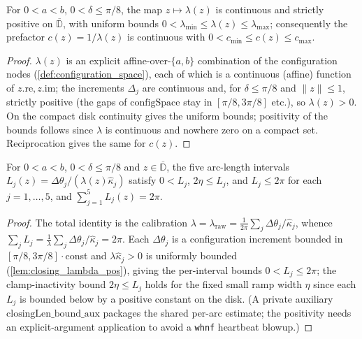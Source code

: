 \begin{lemma}
  \label{lem:closing_lambda_pos}
  For $0<a<b$, $0<\delta\le\pi/8$, the map $z\mapsto\lambda(z)$ is continuous and
  strictly positive on $\overline{\mathbb{D}}$, with uniform bounds
  $0<\lambda_{\min}\le\lambda(z)\le\lambda_{\max}$; consequently the prefactor
  $c(z)=1/\lambda(z)$ is continuous with $0<c_{\min}\le c(z)\le c_{\max}$.
\end{lemma}
\begin{proof}
  $\lambda(z)$ is an explicit affine-over-$\{a,b\}$ combination of the configuration
  nodes (\cref{def:configuration_space}), each of which is a continuous (affine)
  function of $z.\mathrm{re},z.\mathrm{im}$; the increments $\Delta_j$ are continuous
  and, for $\delta\le\pi/8$ and $\|z\|\le1$, strictly positive (the gaps of
  $\mathrm{configSpace}$ stay in $[\pi/8,3\pi/8]$ etc.), so $\lambda(z)>0$. On the
  compact disk continuity gives the uniform bounds; positivity of the bounds follows
  since $\lambda$ is continuous and nowhere zero on a compact set. Reciprocation
  gives the same for $c(z)$.
\end{proof}

\begin{lemma}
  \label{lem:closing_len_bounds}
  For $0<a<b$, $0<\delta\le\pi/8$ and $z\in\overline{\mathbb{D}}$, the five
  arc-length intervals $L_j(z)=\Delta\theta_j/(\lambda(z)\hat\kappa_j)$ satisfy
  $0<L_j$, $2\eta\le L_j$, and $L_j\le 2\pi$ for each $j=1,\dots,5$, and
  $\sum_{j=1}^5 L_j(z)=2\pi$.
\end{lemma}
\begin{proof}
  The total identity is the calibration $\lambda=\lambda_{\mathrm{raw}}=
  \tfrac1{2\pi}\sum_j\Delta\theta_j/\hat\kappa_j$, whence
  $\sum_j L_j=\tfrac1\lambda\sum_j\Delta\theta_j/\hat\kappa_j=2\pi$. Each
  $\Delta\theta_j$ is a configuration increment bounded in $[\pi/8,3\pi/8]\cdot$const
  and $\lambda\hat\kappa_j>0$ is uniformly bounded (\cref{lem:closing_lambda_pos}),
  giving the per-interval bounds $0<L_j\le 2\pi$; the clamp-inactivity bound
  $2\eta\le L_j$ holds for the fixed small ramp width $\eta$ since each $L_j$ is
  bounded below by a positive constant on the disk. (A private auxiliary
  $\mathrm{closingLen\_bound\_aux}$ packages the shared per-arc estimate; the
  positivity needs an explicit-argument application to avoid a \texttt{whnf}
  heartbeat blowup.)
\end{proof}

